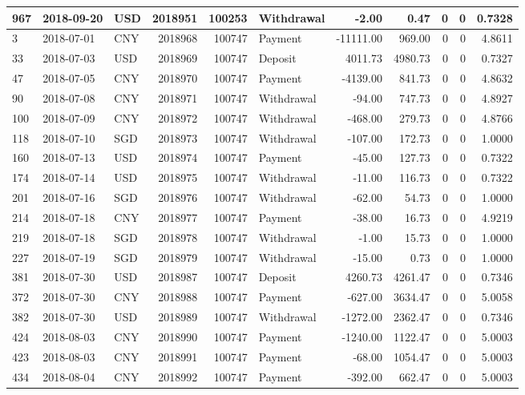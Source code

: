 \documentclass[]{article}
\begin{document}
\begin{table}[H]
\begin{tabular}{l|l|l|r|r|l|r|r|r|r|r}
\hline
967 & 2018-09-20 & USD & 2018951 & 100253 & Withdrawal & -2.00 & 0.47 & 0 & 0 & 0.7328\\
\hline
3 & 2018-07-01 & CNY & 2018968 & 100747 & Payment & -11111.00 & 969.00 & 0 & 0 & 4.8611\\
\hline
33 & 2018-07-03 & USD & 2018969 & 100747 & Deposit & 4011.73 & 4980.73 & 0 & 0 & 0.7327\\
\hline
47 & 2018-07-05 & CNY & 2018970 & 100747 & Payment & -4139.00 & 841.73 & 0 & 0 & 4.8632\\
\hline
90 & 2018-07-08 & CNY & 2018971 & 100747 & Withdrawal & -94.00 & 747.73 & 0 & 0 & 4.8927\\
\hline
100 & 2018-07-09 & CNY & 2018972 & 100747 & Withdrawal & -468.00 & 279.73 & 0 & 0 & 4.8766\\
\hline
118 & 2018-07-10 & SGD & 2018973 & 100747 & Withdrawal & -107.00 & 172.73 & 0 & 0 & 1.0000\\
\hline
160 & 2018-07-13 & USD & 2018974 & 100747 & Payment & -45.00 & 127.73 & 0 & 0 & 0.7322\\
\hline
174 & 2018-07-14 & USD & 2018975 & 100747 & Withdrawal & -11.00 & 116.73 & 0 & 0 & 0.7322\\
\hline
201 & 2018-07-16 & SGD & 2018976 & 100747 & Withdrawal & -62.00 & 54.73 & 0 & 0 & 1.0000\\
\hline
214 & 2018-07-18 & CNY & 2018977 & 100747 & Payment & -38.00 & 16.73 & 0 & 0 & 4.9219\\
\hline
219 & 2018-07-18 & SGD & 2018978 & 100747 & Withdrawal & -1.00 & 15.73 & 0 & 0 & 1.0000\\
\hline
227 & 2018-07-19 & SGD & 2018979 & 100747 & Withdrawal & -15.00 & 0.73 & 0 & 0 & 1.0000\\
\hline
381 & 2018-07-30 & USD & 2018987 & 100747 & Deposit & 4260.73 & 4261.47 & 0 & 0 & 0.7346\\
\hline
372 & 2018-07-30 & CNY & 2018988 & 100747 & Payment & -627.00 & 3634.47 & 0 & 0 & 5.0058\\
\hline
382 & 2018-07-30 & USD & 2018989 & 100747 & Withdrawal & -1272.00 & 2362.47 & 0 & 0 & 0.7346\\
\hline
424 & 2018-08-03 & CNY & 2018990 & 100747 & Payment & -1240.00 & 1122.47 & 0 & 0 & 5.0003\\
\hline
423 & 2018-08-03 & CNY & 2018991 & 100747 & Payment & -68.00 & 1054.47 & 0 & 0 & 5.0003\\
\hline
434 & 2018-08-04 & CNY & 2018992 & 100747 & Payment & -392.00 & 662.47 & 0 & 0 & 5.0003\\

\end{tabular}
\end{table}
\end{document}
